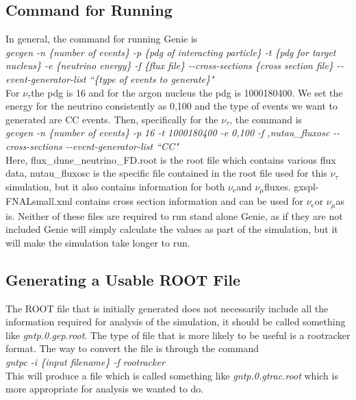 \documentclass{article}
\newcommand{\nutau}{$\nu_{\tau}$\space}
\newcommand{\nue}{$\nu_{\text{e}}$\space}
\newcommand{\numu}{$\nu_{\mu}$\space}
\begin{document}
\subsection{Command for Running}
In general, the command for running Genie is
\\ 
\textit{gevgen -n \{number of events\} -p \{pdg of interacting particle\} -t \{pdg for target nucleus\} -e \{neutrino energy\} -f \{flux file\} -{}-cross-sections \{cross section file\} -{}-event-generator-list ``\{type of events to generate\}"}
\\ 
For \nutau the pdg is 16 and for the argon nucleus the pdg is 1000180400. We set the energy for the neutrino consistently as 0,100 and the type of events we want to generated are CC events. Then, specifically for the $\nu_\tau$, the command is
\\ 
\textit{gevgen -n \{number of events\} -p 16 -t 1000180400 -e 0,100 -f ,nutau\_fluxosc -{}-cross-sections  -{}-event-generator-list ``CC"}
\\ 
Here, flux\_dune\_neutrino\_FD.root is the root file which contains various flux data, nutau\_fluxosc is the specific file contained in the root file used for this \nutau simulation, but it also contains information for both \nue and \numu fluxes. gxspl-FNALsmall.xml contains cross section information and can be used for \nue or \numu as is. Neither of these files are required to run stand alone Genie, as if they are not included Genie will simply calculate the values as part of the simulation, but it will make the simulation take longer to run.

\subsection{Generating a Usable ROOT File}
The ROOT file that is initially generated does not necessarily include all the information required for analysis of the simulation, it should be called something like \textit{gntp.0.gep.root}. The type of file that is more likely to be useful is a rootracker format. The way to convert the file is through the command
\\
\textit{gntpc -i \{input filename\} -f rootracker} 
\\
This will produce a file which is called something like \textit{gntp.0.gtrac.root} which is more appropriate for analysis we wanted to do.
\end{document}
